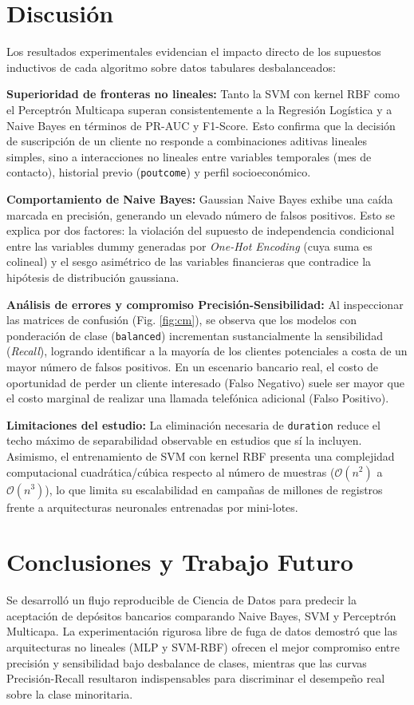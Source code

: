 \documentclass[conference]{IEEEtran}
\begin{document}
\section{Discusión}
Los resultados experimentales evidencian el impacto directo de los supuestos inductivos de cada algoritmo sobre datos tabulares desbalanceados:

\textbf{Superioridad de fronteras no lineales:} Tanto la SVM con kernel RBF como el Perceptrón Multicapa superan consistentemente a la Regresión Logística y a Naive Bayes en términos de PR-AUC y F1-Score. Esto confirma que la decisión de suscripción de un cliente no responde a combinaciones aditivas lineales simples, sino a interacciones no lineales entre variables temporales (mes de contacto), historial previo (\texttt{poutcome}) y perfil socioeconómico.

\textbf{Comportamiento de Naive Bayes:} Gaussian Naive Bayes exhibe una caída marcada en precisión, generando un elevado número de falsos positivos. Esto se explica por dos factores: la violación del supuesto de independencia condicional entre las variables dummy generadas por \textit{One-Hot Encoding} (cuya suma es colineal) y el sesgo asimétrico de las variables financieras que contradice la hipótesis de distribución gaussiana.

\textbf{Análisis de errores y compromiso Precisión-Sensibilidad:} Al inspeccionar las matrices de confusión (Fig. \ref{fig:cm}), se observa que los modelos con ponderación de clase (\texttt{balanced}) incrementan sustancialmente la sensibilidad (\textit{Recall}), logrando identificar a la mayoría de los clientes potenciales a costa de un mayor número de falsos positivos. En un escenario bancario real, el costo de oportunidad de perder un cliente interesado (Falso Negativo) suele ser mayor que el costo marginal de realizar una llamada telefónica adicional (Falso Positivo).

\textbf{Limitaciones del estudio:} La eliminación necesaria de \texttt{duration} reduce el techo máximo de separabilidad observable en estudios que sí la incluyen. Asimismo, el entrenamiento de SVM con kernel RBF presenta una complejidad computacional cuadrática/cúbica respecto al número de muestras ($\mathcal{O}(n^2)$ a $\mathcal{O}(n^3)$), lo que limita su escalabilidad en campañas de millones de registros frente a arquitecturas neuronales entrenadas por mini-lotes.

\section{Conclusiones y Trabajo Futuro}
Se desarrolló un flujo reproducible de Ciencia de Datos para predecir la aceptación de depósitos bancarios comparando Naive Bayes, SVM y Perceptrón Multicapa. La experimentación rigurosa libre de fuga de datos demostró que las arquitecturas no lineales (MLP y SVM-RBF) ofrecen el mejor compromiso entre precisión y sensibilidad bajo desbalance de clases, mientras que las curvas Precisión-Recall resultaron indispensables para discriminar el desempeño real sobre la clase minoritaria.
\end{document}
